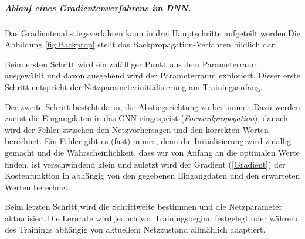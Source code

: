 \documentclass[12pt,a4paper]{scrartcl}
\numberwithin{equation}{section}
\begin{document}
\subparagraph{Ablauf eines Gradientenverfahrens im \ac{DNN}.}

Das Gradientenabstiegsverfahren kann in drei Hauptschritte aufgeteilt werden.Die Abbildung \ref{fig:Backprop} stellt das Backpropagation-Verfahren bildlich dar.

Beim ersten Schritt  wird ein zufälliger Punkt aus dem Parameterraum ausgewählt und davon ausgehend wird der Parameterraum exploriert. Dieser erste Schritt entspricht der Netzparameterinitialisierung am Trainingsanfang.

Der zweite Schritt besteht darin, die Abstiegsrichtung zu bestimmen.Dazu werden zuerst die Eingangdaten in das \ac{CNN} eingespeist (\textit{Forwardpropogation}), danach wird der Fehler zwischen den Netzvorhersagen und den korrekten Werten berechnet. Ein Fehler gibt es (fast) immer, denn die Initialisierung wird zufällig gemacht und die Wahrscheinlichkeit, dass wir von Anfang an die optimalen Werte finden, ist verschwindend klein und zuletzt wird der Gradient (\ref{Gradient}) der Kostenfunktion in abhängig von den gegebenen Eingangdaten und den erwarteten Werten berechnet. 

Beim letzten Schritt wird die Schrittweite bestimmen und die Netzparameter aktualisiert.Die Lernrate wird jedoch vor Trainingsbeginn festgelegt oder während des Trainings abhängig von aktuellem Netzzustand allmählich adaptiert.
\end{document}
